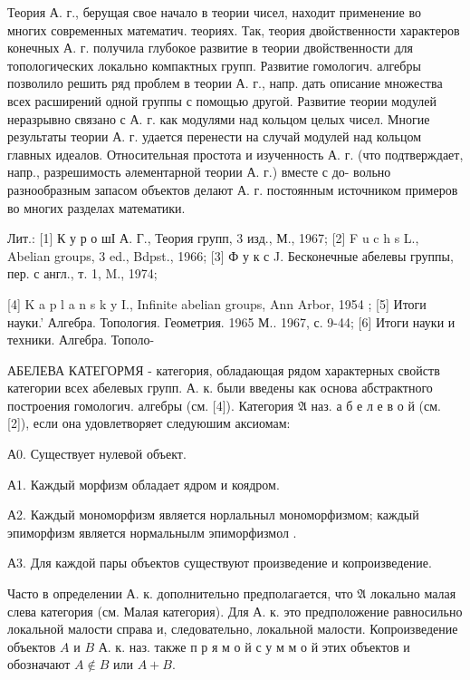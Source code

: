 \documentclass[10pt]{article}
\begin{document}
Теория А. г., берущая свое начало в теории чисел, находит применение во многих современных математич. теориях. Так, теория двойственности характеров конечных А. г. получила глубокое развитие в теории двойственности для топологических локально компактных групп. Развитие гомологич. алгебры позволило решить ряд проблем в теории А. г., напр. дать описание множества всех расширений одной группы с помощью другой. Развитие теории модулей неразрывно связано с А. г. как модулями над кольцом целых чисел. Многие результаты теории А. г. удается перенести на случай модулей над кольцом главных идеалов. Относительная простота и изученность А. г. (что подтверждает, напр., разрешимость әлементарной теории А. г.) вместе с до- вольно разнообразным запасом объектов делают А. г. постоянным источником примеров во многих разделах математики.



Лит.: [1] К у р о шІ А. Г., Теория групп, 3 изд., М., 1967; [2] F u c h s L., Abelian groups, 3 ed., Bdpst., 1966; [3] Ф у к с J. Бесконечные абелевы группы, пер. с англ., т. 1, M., 1974;

[4] K a p l a n s k y I., Infinite abelian groups, Ann Arbor, 1954 ; [5] Итоги науки.' Алгебра. Топология. Геометрия. 1965 М.. 1967, с. 9-44; [6] Итоги науки и техники. Алгебра. Тополо-



АБЕЛЕВА КАТЕГОРМЯ - категория, обладающая рядом характерных свойств категории всех абелевых групп. А. к. были введены как основа абстрактного построения гомологич. алгебры (см. [4]). Категория $\mathfrak{A}$ наз. а б е л е в о й (см. [2]), если она удовлетворяет следуюшим аксиомам:



А0. Существует нулевой объект.



А1. Каждый морфизм обладает ядром и коядром.



А2. Каждый мономорфизм является норлальныл мономорфизмом; каждый эпиморфизм является нормальнылм эпиморфизмол .



А3. Для каждой пары объектов существуют произведение и копроизведение.



Часто в определении А. к. дополнительно предполагается, что $\mathfrak{A}$ локально малая слева категория (см. Малая категория). Для А. к. это предположение равносильно локальной малости справа и, следовательно, локальной малости. Копроизведение объектов $A$ и $B$ А. к. наз. также п р я м о й с у м м о й этих объектов и обозначают $A \notin B$ или $A+B$.
\end{document}
